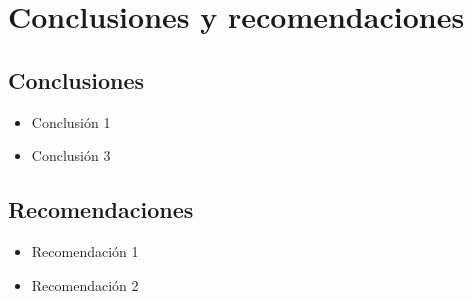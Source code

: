 \section{Conclusiones y recomendaciones}
\label{sec:Conclusiones}

\subsection{Conclusiones}

\begin{itemize}
	\item Conclusión 1
    \item Conclusión 3
\end{itemize}

\subsection{Recomendaciones}

\begin{itemize}
	\item Recomendación 1
    \item Recomendación 2
\end{itemize}